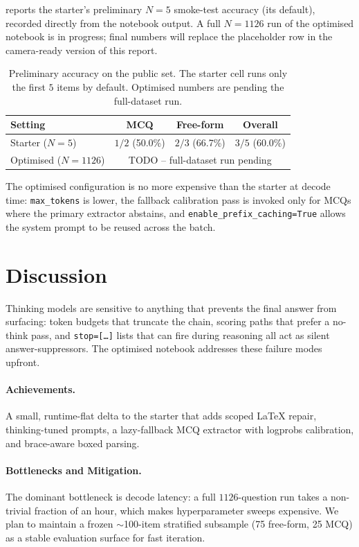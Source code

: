 \documentclass{article}
\begin{document}
 reports the starter's preliminary $N{=}5$ smoke-test
accuracy (its default), recorded directly from the notebook output. A full
$N{=}1126$ run of the optimised notebook is in progress; final numbers will
replace the placeholder row in the camera-ready version of this report.

\begin{table}[h]
  \caption{Preliminary accuracy on the public set. The starter cell runs
    only the first $5$ items by default. Optimised numbers are pending the
    full-dataset run.}
  \label{tab:dev-results}
  \centering
  \begin{tabular}{lccc}
    \toprule
    Setting & MCQ & Free-form & Overall \\
    \midrule
    Starter ($N{=}5$)   & $1/2$ (50.0\%) & $2/3$ (66.7\%) & $3/5$ (60.0\%) \\
    Optimised ($N{=}1126$) & \multicolumn{3}{c}{TODO -- full-dataset run pending} \\
    \bottomrule
  \end{tabular}
\end{table}

The optimised configuration is no more expensive than the starter at decode
time: \texttt{max\_tokens} is lower, the fallback calibration pass is
invoked only for MCQs where the primary extractor abstains, and
\texttt{enable\_prefix\_caching=True} allows the system prompt to be reused
across the batch.


\section{Discussion}
\label{sec:discussion}

Thinking models are sensitive to anything that prevents the final answer from
surfacing: token budgets that truncate the chain, scoring paths that prefer
a no-think pass, and \texttt{stop=[\ldots]} lists that can fire during
reasoning all act as silent answer-suppressors. The optimised notebook
addresses these failure modes upfront.

\paragraph{Achievements.}
A small, runtime-flat delta to the starter that adds scoped LaTeX repair,
thinking-tuned prompts, a lazy-fallback MCQ extractor with logprobs
calibration, and brace-aware boxed parsing.

\paragraph{Bottlenecks and Mitigation.}
The dominant bottleneck is decode latency: a full $1126$-question run takes
a non-trivial fraction of an hour, which makes hyperparameter sweeps
expensive. We plan to maintain a frozen $\sim$100-item stratified subsample
(75 free-form, 25 MCQ) as a stable evaluation surface for fast iteration.
\end{document}
